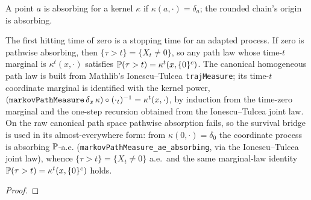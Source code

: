 \begin{definition}
  \label{def:absorbing}
  \leanok
  A point $a$ is absorbing for a kernel $\kappa$ if $\kappa(a,\cdot)=\delta_a$; the
  rounded chain's origin is absorbing.
\end{definition}

\begin{lemma}
  \label{lem:absorption-time}
  \leanok
  The first hitting time of zero is a stopping time for an adapted process. If zero is
  pathwise absorbing, then $\{\tau>t\}=\{X_t\ne0\}$, so any path law whose time-$t$
  marginal is $\kappa^t(x,\cdot)$ satisfies
  $\mathbb{P}(\tau>t)=\kappa^t(x,\{0\}^c)$. The canonical homogeneous path law is built from
  Mathlib's Ionescu--Tulcea \texttt{trajMeasure}; its time-$t$ coordinate marginal is
  identified with the kernel power, $(\text{\texttt{markovPathMeasure}}\,\delta_x\,\kappa)
  \circ (\cdot_t)^{-1} = \kappa^t(x,\cdot)$, by induction from the time-zero marginal and
  the one-step recursion obtained from the Ionescu--Tulcea joint law. On the raw canonical
  path space pathwise absorption fails, so the survival bridge is used in its
  almost-everywhere form: from $\kappa(0,\cdot)=\delta_0$ the coordinate process is
  absorbing $\mathbb{P}$-a.e. (\texttt{markovPathMeasure\_ae\_absorbing}, via the Ionescu--Tulcea
  joint law), whence $\{\tau>t\}=\{X_t\ne0\}$ a.e.\ and the same marginal-law identity
  $\mathbb{P}(\tau>t)=\kappa^t(x,\{0\}^c)$ holds.
\end{lemma}
\begin{proof}\leanok{}\end{proof}

